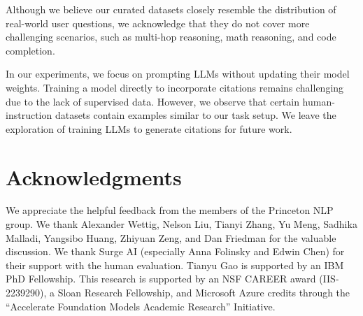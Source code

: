 \documentclass[11pt]{article}
\begin{document}
Although we believe our curated datasets closely resemble the distribution of real-world user questions,
we acknowledge that they do not cover more challenging scenarios, such as
multi-hop reasoning, math reasoning, and code completion.


In our experiments, we focus on prompting LLMs without updating their model weights.
Training a model directly to incorporate citations remains challenging due to the lack of supervised data.
However, we observe that certain human-instruction datasets
contain examples similar to our task setup.
We leave the exploration of training LLMs to generate citations for future work.



\section*{Acknowledgments}

We appreciate the helpful feedback from the members of the Princeton NLP group. %
We thank Alexander Wettig, Nelson Liu, Tianyi Zhang, Yu Meng, Sadhika Malladi, Yangsibo Huang, Zhiyuan Zeng, and Dan  Friedman for the valuable discussion.
We thank Surge AI (especially Anna Folinsky and Edwin Chen)
for their support with the human evaluation.
Tianyu Gao is supported by an IBM PhD Fellowship. 
This research is supported by an NSF CAREER award (IIS-2239290), a Sloan Research Fellowship, 
and Microsoft Azure credits through the ``Accelerate Foundation Models Academic Research'' Initiative. 






\clearpage
\appendix


\end{document}
